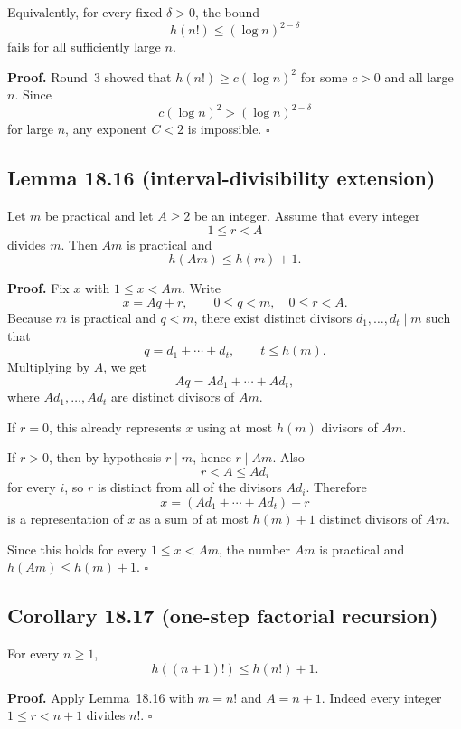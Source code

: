 Equivalently, for every fixed \(\delta>0\), the bound
\[
h(n!)\le (\log n)^{2-\delta}
\]
fails for all sufficiently large \(n\).

\medskip

\noindent\textbf{Proof.}
Round~3 showed that \(h(n!)\ge c(\log n)^2\) for some \(c>0\) and all large \(n\). Since
\[
c(\log n)^2>(\log n)^{2-\delta}
\]
for large \(n\), any exponent \(C<2\) is impossible.
\hfill\(\square\)

\subsection*{Lemma 18.16 (interval-divisibility extension)}

Let \(m\) be practical and let \(A\ge 2\) be an integer. Assume that every integer
\[
1\le r<A
\]
divides \(m\). Then \(Am\) is practical and
\[
h(Am)\le h(m)+1.
\]

\medskip

\noindent\textbf{Proof.}
Fix \(x\) with \(1\le x<Am\). Write
\[
x=Aq+r,\qquad 0\le q<m,\quad 0\le r<A.
\]
Because \(m\) is practical and \(q<m\), there exist distinct divisors \(d_1,\dots,d_t\mid m\) such that
\[
q=d_1+\cdots+d_t,\qquad t\le h(m).
\]
Multiplying by \(A\), we get
\[
Aq=Ad_1+\cdots+Ad_t,
\]
where \(Ad_1,\dots,Ad_t\) are distinct divisors of \(Am\).

If \(r=0\), this already represents \(x\) using at most \(h(m)\) divisors of \(Am\).

If \(r>0\), then by hypothesis \(r\mid m\), hence \(r\mid Am\). Also
\[
r<A\le Ad_i
\]
for every \(i\), so \(r\) is distinct from all of the divisors \(Ad_i\). Therefore
\[
x=(Ad_1+\cdots+Ad_t)+r
\]
is a representation of \(x\) as a sum of at most \(h(m)+1\) distinct divisors of \(Am\).

Since this holds for every \(1\le x<Am\), the number \(Am\) is practical and \(h(Am)\le h(m)+1\).
\hfill\(\square\)

\subsection*{Corollary 18.17 (one-step factorial recursion)}

For every \(n\ge 1\),
\[
h((n+1)!)\le h(n!)+1.
\]

\medskip

\noindent\textbf{Proof.}
Apply Lemma~18.16 with \(m=n!\) and \(A=n+1\). Indeed every integer \(1\le r<n+1\) divides \(n!\).
\hfill\(\square\)


